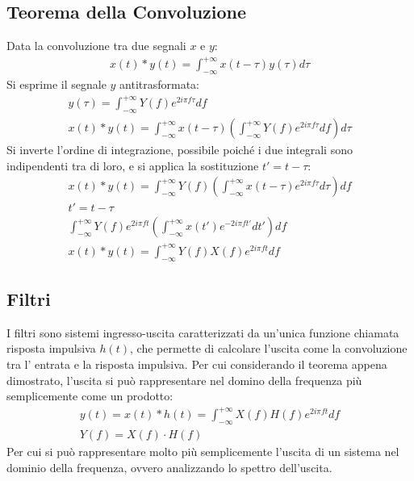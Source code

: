 \documentclass{article}
\numberwithin{equation}{subsection}
\begin{document}
\subsection{Teorema della Convoluzione}

Data la convoluzione tra due segnali $x$ e $y$:
\begin{gather*}
    x(t)*y(t)=\displaystyle\int_{-\infty}^{+\infty}x(t-\tau)y(\tau)d\tau
\end{gather*}
Si esprime il segnale $y$ antitrasformata:
\begin{gather*}
    y(\tau)=\displaystyle\int_{-\infty}^{+\infty}Y(f)e^{2i\pi f\tau}df\\
    x(t)*y(t)=\displaystyle\int_{-\infty}^{+\infty}x(t-\tau)\left(\int_{-\infty}^{+\infty}Y(f)e^{2i\pi f\tau}df\right)d\tau
\end{gather*}
Si inverte l'ordine di integrazione, possibile poiché i due integrali sono indipendenti tra di loro, e si applica la sostituzione $t'=t-\tau$: 
\begin{gather*}
    x(t)*y(t)=\displaystyle\int_{-\infty}^{+\infty}Y(f)\left(\int_{-\infty}^{+\infty}x(t-\tau)e^{2i\pi f\tau}d\tau\right)df\\
    t'=t-\tau\\
    \int_{-\infty}^{+\infty}Y(f)e^{2i\pi ft}\left(\int_{-\infty}^{+\infty}x(t')e^{-2i\pi ft'}dt'\right)df\\
    x(t)*y(t)=\displaystyle\int_{-\infty}^{+\infty}Y(f)X(f)e^{2i\pi ft}df
\end{gather*}

\subsection{Filtri}

I filtri sono sistemi ingresso-uscita caratterizzati da un'unica funzione chiamata risposta impulsiva $h(t)$, che permette di calcolare l'uscita come la convoluzione tra l'
entrata e la risposta impulsiva. Per cui considerando il teorema appena dimostrato, l'uscita si può rappresentare nel domino della frequenza più semplicemente come un prodotto:
\begin{gather*}
    y(t)=x(t)*h(t)=\displaystyle\int_{-\infty}^{+\infty}X(f)H(f)e^{2i\pi ft}df\\
    Y(f)=X(f)\cdot H(f)
\end{gather*}
Per cui si può rappresentare molto più semplicemente l'uscita di un sistema nel dominio della frequenza, ovvero analizzando lo spettro dell'uscita. 
\end{document}
